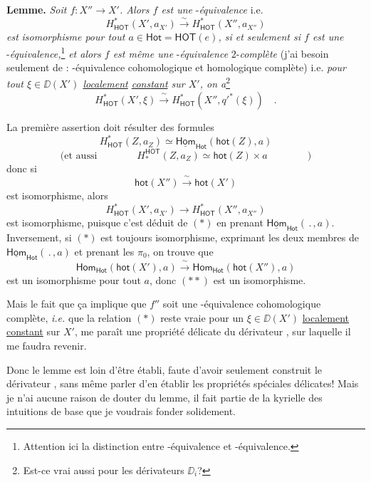 \textbf{Lemme.} \textit{Soit $f : X'' \to X'$. Alors $f$ est une} \HOT-\textit{équivalence} i.e.
\[ H^{*}_{\mathsf{HOT}}(X', a_{X'}) \xrightarrow{\ \sim\ } H^{*}_{\mathsf{HOT}}(X'', a_{X''}) \]
\textit{est} \textit{isomorphisme pour tout $a \in \mathsf{Hot} = \mathsf{HOT}(e)$, si et seulement si $f$ est une} \Hot-\textit{équivalence,}\footnote[56]{Attention ici la distinction entre \HOT-équivalence et \Hot-équivalence.} \textit{et alors $f$ est même une} \HOT-\textit{équivalence} $2$-\textit{complète} (j'ai besoin seulement de : \HOT-équivalence cohomologique et homologique complète) i.e. \textit{pour tout $\xi \in \DD(X')$ \underline{localement} \underline{constant} sur $X'$, on a}\footnote[57]{Est-ce vrai aussi pour les dérivateurs $\DD_i$?}
\[ H^{*}_{\mathsf{HOT}}(X',\xi) \xrightarrow{\ \sim\ } H^{*}_{\mathsf{HOT}}(X'',{q'}^{*}(\xi)) \quad . \]

La première assertion doit résulter des formules
\[ H^{*}_{\mathsf{HOT}}(Z,a_Z) \simeq \underline{\mathsf{Hom}}_{\mathsf{Hot}}(\mathsf{hot}(Z),a) \tag*{$(*)$} \]
\[ \text{(et aussi} \qquad\qquad H_{*}^{\mathsf{HOT}}(Z,a_Z) \simeq \mathsf{hot}(Z) \times a \qquad\qquad ) \]
donc si
\[ \mathsf{hot}(X'') \xrightarrow{\ \sim\ } \mathsf{hot}(X') \tag*{$(**)$} \]
est isomorphisme, alors
\[ H^{*}_{\mathsf{HOT}}(X', a_{X'}) \longrightarrow H^{*}_{\mathsf{HOT}}(X'', a_{X''}) \]
est isomorphisme, puisque c'est déduit de $(*)$ en prenant $\underline{\mathsf{Hom}}_{\mathsf{Hot}}(\,.\,,a)$. Inversement, si $(*)$ est toujours isomorphisme, exprimant les deux membres de $\underline{\mathsf{Hom}}_{\mathsf{Hot}}(\,.\,,a)$ et prenant les $\pi_0$, on trouve que
\[ \mathsf{Hom}_{\mathsf{Hot}}(\mathsf{hot}(X'),a) \xrightarrow{\ \sim\ } \mathsf{Hom}_{\mathsf{Hot}}(\mathsf{hot}(X''),a) \]
est un isomorphisme pour tout $a$, donc $(**)$ est un isomorphisme.

Mais le fait que ça implique que $f''$ soit une \HOT-équivalence cohomologique complète, \textit{i.e.} que la relation $(*)$ reste vraie pour un $\xi \in \DD(X')$ \underline{localement} \underline{constant} sur $X'$, me paraît une propriété délicate du dérivateur \HOT, sur laquelle il me faudra revenir.

Donc le lemme est loin d'être établi, faute d'avoir seulement construit le dérivateur \HOT, sans même parler d'en établir les propriétés spéciales délicates! Mais je n'ai aucune raison de douter du lemme, il fait partie de la kyrielle des intuitions de base que je voudrais fonder solidement.

